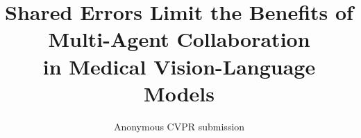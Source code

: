 \documentclass[10pt,twocolumn,letterpaper]{article}
\title{Shared Errors Limit the Benefits of Multi-Agent Collaboration\\in Medical Vision-Language Models}
\author{Anonymous CVPR submission}
\begin{document}
\maketitle






{
    \small
    
    
}


\end{document}
